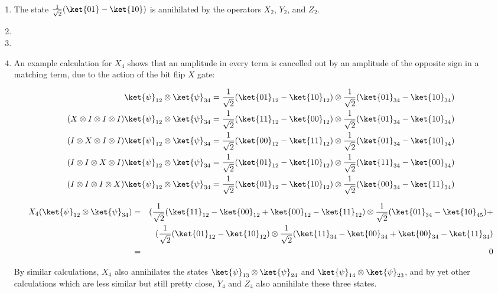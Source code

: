 \documentclass[12pt]{article}
\begin{document}
\begin{enumerate}
\item %
The state $\normtwo(\ket{01}-\ket{10})$ is annihilated by the operators
$X_2$, $Y_2$, and $Z_2$.

\item %
\item %
\item %
An example calculation for $X_4$ shows that an amplitude in every term is
cancelled out by an amplitude of the opposite sign in a matching term, due
to the action of the bit flip $X$ gate:

\begin{eqnarray*}
\ket{\psi}_{12}\otimes\ket{\psi}_{34} & =
\normtwo(\ket{01}_{12}-\ket{10}_{12}) \otimes \normtwo(\ket{01}_{34}-\ket{10}_{34})\\
(X\otimes I \otimes I \otimes I)\ket{\psi}_{12}\otimes\ket{\psi}_{34} & =
\normtwo(\ket{11}_{12}-\ket{00}_{12}) \otimes \normtwo(\ket{01}_{34}-\ket{10}_{34})\\
(I\otimes X \otimes I \otimes I)\ket{\psi}_{12}\otimes\ket{\psi}_{34} & =
\normtwo(\ket{00}_{12}-\ket{11}_{12}) \otimes \normtwo(\ket{01}_{34}-\ket{10}_{34})\\
(I\otimes I \otimes X \otimes I)\ket{\psi}_{12}\otimes\ket{\psi}_{34} & =
\normtwo(\ket{01}_{12}-\ket{10}_{12}) \otimes \normtwo(\ket{11}_{34}-\ket{00}_{34})\\
(I\otimes I \otimes I \otimes X)\ket{\psi}_{12}\otimes\ket{\psi}_{34} & =
\normtwo(\ket{01}_{12}-\ket{10}_{12}) \otimes \normtwo(\ket{00}_{34}-\ket{11}_{34})
\end{eqnarray*}

\begin{eqnarray*}
X_4(\ket{\psi}_{12}\otimes\ket{\psi}_{34}) & = & (\normtwo(\ket{11}_{12}-\ket{00}_{12}+\ket{00}_{12}-\ket{11}_{12})\otimes\normtwo(\ket{01}_{34}-\ket{10}_{45})+\\
& & (\normtwo(\ket{01}_{12}-\ket{10}_{12}) \otimes \normtwo(\ket{11}_{34}-\ket{00}_{34}+\ket{00}_{34}-\ket{11}_{34})\\
& = & 0
\end{eqnarray*}

By similar calculations, $X_4$ also annihilates the states
$\ket{\psi}_{13}\otimes\ket{\psi}_{24}$ and
$\ket{\psi}_{14}\otimes\ket{\psi}_{23}$, and by yet other calculations which
are less similar but still pretty close,
$Y_4$ and $Z_4$ also annihilate these three states.


\end{enumerate}
\end{document}

